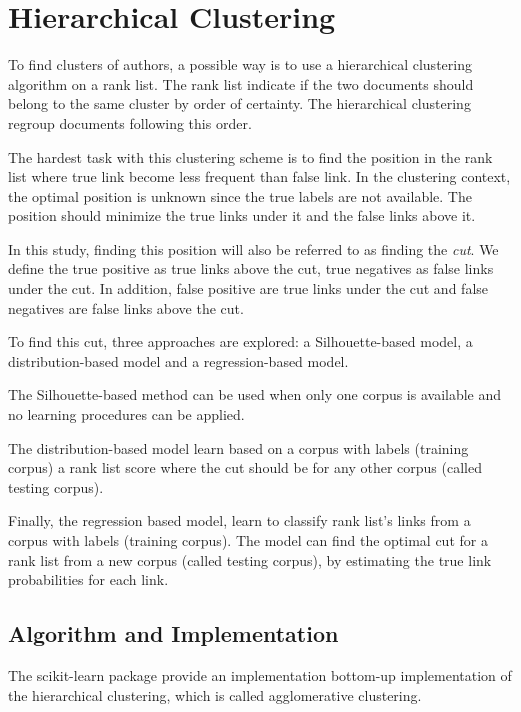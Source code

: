 \section{Hierarchical Clustering \label{sec:authorship_clustering_methods}}

To find clusters of authors, a possible way is to use a hierarchical clustering algorithm on a rank list.
The rank list indicate if the two documents should belong to the same cluster by order of certainty.
The hierarchical clustering regroup documents following this order.

The hardest task with this clustering scheme is to find the position in the rank list where true link become less frequent than false link.
In the clustering context, the optimal position is unknown since the true labels are not available.
The position should minimize the true links under it and the false links above it.

In this study, finding this position will also be referred to as finding the \textit{cut}.
We define the true positive as true links above the cut, true negatives as false links under the cut.
In addition, false positive are true links under the cut and false negatives are false links above the cut.

To find this cut, three approaches are explored: a Silhouette-based model, a distribution-based model and a regression-based model.

The Silhouette-based method can be used when only one corpus is available and no learning procedures can be applied.

The distribution-based model learn based on a corpus with labels (training corpus) a rank list score where the cut should be for any other corpus (called testing corpus).

Finally, the regression based model, learn to classify rank list's links from a corpus with labels (training corpus).
The model can find the optimal cut for a rank list from a new corpus (called testing corpus), by estimating the true link probabilities for each link.

\subsection{Algorithm and Implementation \label{sec:algorithm_and_implementation}}

The scikit-learn package \cite{sklearn} provide an implementation bottom-up implementation of the hierarchical clustering, which is called agglomerative clustering.

